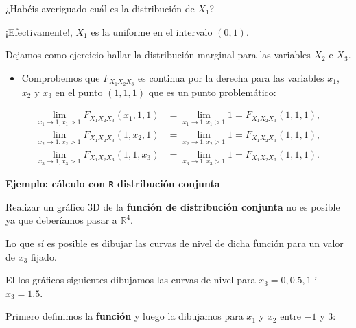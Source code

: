 \documentclass[]{book}
\providecommand{\tightlist}{%
  \setlength{\itemsep}{0pt}\setlength{\parskip}{0pt}}
\begin{document}
¿Habéis averiguado cuál es la distribución de \(X_1\)?

¡Efectivamente!, \(X_1\) es la uniforme en el intervalo \((0,1)\).

Dejamos como ejercicio hallar la distribución marginal para las variables \(X_2\) e \(X_3\).

\begin{itemize}
\tightlist
\item
  Comprobemos que \(F_{X_1X_2X_3}\) es continua por la derecha para las variables \(x_1\), \(x_2\) y \(x_3\) en el punto \((1,1,1)\) que es un punto problemático:
\end{itemize}

\[
\begin{array}{rl}
 \lim_{x_1\to 1,x_1> 1} F_{X_1X_2X_3}(x_1,1,1) & =\lim_{x_1\to 1,x_1> 1} 1  = F_{X_1X_2X_3}(1,1,1),\\
 \lim_{x_2\to 1,x_2> 1} F_{X_1X_2X_3}(1,x_2,1) & =\lim_{x_2\to 1,x_2> 1} 1 = F_{X_1X_2X_3}(1,1,1),\\  
\lim_{x_3\to 1,x_3> 1} F_{X_1X_2X_3}(1,1,x_3) & =\lim_{x_3\to 1,x_3> 1} 1  = F_{X_1X_2X_3}(1,1,1).
\end{array}
\]

\textbf{Ejemplo: cálculo con \texttt{R} distribución conjunta}

Realizar un gráfico 3D de la \textbf{función de distribución conjunta} no es posible ya que deberíamos pasar a \(\mathbb{R}^4\).

Lo que sí es posible es dibujar las curvas de nivel de dicha función para un valor de \(x_3\) fijado.

El los gráficos siguientes dibujamos las curvas de nivel para \(x_3=0,0.5,1\) i \(x_3=1.5\).

Primero definimos la \textbf{función} y luego la dibujamos para \(x_1\) y \(x_2\) entre \(-1\) y \(3\):
\end{document}
